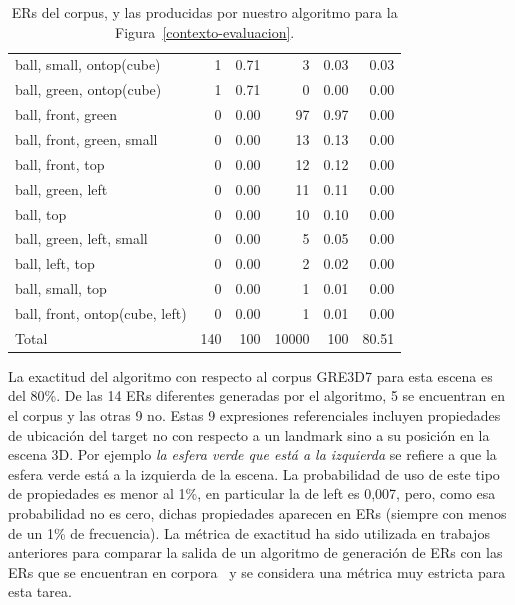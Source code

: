 \begin{table}[h]
\begin{small}
\begin{center}
\begin{tabular}{|l|r|r|r|r|r|}
ball, small, ontop(cube)                       &  1 &  0.71 &    3 &  0.03 &  0.03 \\
ball, green, ontop(cube)                       &  1 &  0.71 &    0 &  0.00 &  0.00\\
ball, front, green                              &  0 &  0.00 &   97 &  0.97 &  0.00\\
ball, front, green, small                        &  0 &  0.00 &   13 &  0.13 &  0.00\\
ball, front, top                                &  0 &  0.00 &   12 &  0.12 &  0.00\\
ball, green, left	                              &  0 &  0.00 &   11 &  0.11 &  0.00\\
ball, top                                      &  0 &  0.00 &   10 &  0.10 &  0.00\\
ball, green, left, small                         &  0 &  0.00 &    5 &  0.05 &  0.00\\
ball, left, top                                 &  0 &  0.00 &    2 &  0.02 &  0.00\\
ball, small, top                                &  0 &  0.00 &    1 &  0.01 &  0.00\\
ball, front, ontop(cube, left)                  &  0 &  0.00 &    1 &  0.01 &  0.00\\

\hline
Total & 140 & 100 & 10000 & 100 & 80.51 \\
\hline
\end{tabular}
\caption{ERs del corpus, y las producidas por nuestro algoritmo para la Figura~\protect\ref{contexto-evaluacion}.}\label{results-algo-fig3}
\vspace*{-.5cm}
\end{center}
\end{small}
\end{table}

 La exactitud del algoritmo con respecto al corpus GRE3D7 para esta escena es del 80\%. De las 14 ERs diferentes generadas por el algoritmo, 5 se encuentran en el corpus y las otras 9 no. Estas 9 expresiones referenciales incluyen propiedades de ubicaci\'on del target no con respecto a un landmark sino a su posici\'on en la escena 3D. Por ejemplo \emph{la esfera verde que est\'a a la izquierda} se refiere a que la esfera verde est\'a a la izquierda de la escena.  La probabilidad de uso de este tipo de propiedades es menor al 1\%, en particular la de left es 0,007, pero, como esa probabilidad no es cero, dichas propiedades aparecen en ERs (siempre con menos de un 1\% de frecuencia).  La m\'etrica de exactitud ha sido utilizada en trabajos anteriores para comparar la salida de un algoritmo de generaci\'on de ERs con las ERs que se encuentran en corpora~\cite{sluis07:eval,viet:gene11} y se considera una m\'etrica muy estricta para esta tarea.

